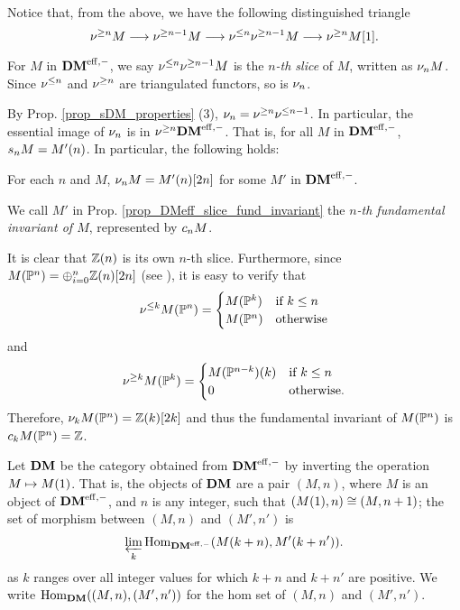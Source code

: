 Notice that, from the above, we have the following distinguished
triangle
\begin{equation}
\sgDM{n} M \to \sgDM{n - 1} M \to \slDM{n} \sgDM{n - 1} M
\to \sgDM{n} M[1].
\end{equation}

\begin{defn}
For $M$ in $\DMeff$, we say $\slDM{n}\sgDM{n - 1}M$ is the 
\emph{$n$-th slice} of $M$, written as $\sliceDM{n}M$. Since
$\slDM{n}$ and $\sgDM{n}$ are triangulated functors, so is 
$\sliceDM{n}$.
\end{defn}

By Prop. \ref{prop_sDM_properties} (3), $\sliceDM{n} =
\sgDM{n}\slDM{n - 1}$. In particular, the essential image of
$\sliceDM{n}$ is in $\sgDM{n}\DMeff$. That is, for all $M$ in 
$\DMeff$, $\slice{n}M = \tZ[n]{M'}$. In particular, the following
holds:

\begin{prop}\label{prop_DMeff_slice_fund_invariant}
For each $n$ and $M$, $\sliceDM{n}M = M'(n)[2n]$ for some $M'$ in
$\DMeff$.
\end{prop}

\begin{defn}\label{def_fI_DMeff}
We call $M'$ in Prop. \ref{prop_DMeff_slice_fund_invariant} the 
\emph{$n$-th fundamental invariant of $M$}, represented by
$\fIDM{n}M$.
\end{defn}

\begin{ex}\label{ex_sfilt_MPn}
It is clear that $\Z(n)$ is its own $n$-th slice. Furthermore,
since $M(\P^n) = \oplus_{i = 0}^n \Z(n)[2n]$ (see 
\cite[15.5]{MVW}), it is easy to verify that 
\[
\slDM{k}M(\P^n) = \begin{cases}
M(\P^k) & \textrm{if }k \leq n \\
M(\P^n) & \textrm{otherwise}
\end{cases}
\]
and 
\[
\sgDM{k}M(\P^k) = \begin{cases}
\tZ[k]{M(\P^{n - k})} & \textrm{if }k \leq n\\
0 & \textrm{otherwise}.
\end{cases}
\]
Therefore, $\sliceDM{k} M(\P^n) = \Z(k)[2k]$ and thus the 
fundamental invariant of $M(\P^n)$ is $\fIDM{k}M(\P^n) = \Z$.
\end{ex}

\begin{defn}
Let $\DM$ be the category obtained from $\DMeff$ by inverting
the operation $M \mapsto \tZ{M}$. That is, the objects of $\DM$
are a pair $(M, n)$, where $M$ is an object of $\DMeff$, and $n$
is any integer, such that $(\tZ{M}, n) \cong (M, n + 1)$; the set 
of morphism between $(M, n)$ and $(M', n')$ is 
\[
\varprojlim_{k} \homDMf(\tZ[k + n]{M}, \tZ[k + n']{M'}).
\]
as $k$ ranges over all integer values for which $k + n$ and 
$k + n'$ are positive. We write $\homDM((M, n), (M',n'))$ for the 
hom set of $(M, n)$ and $(M', n')$. 
\end{defn}

